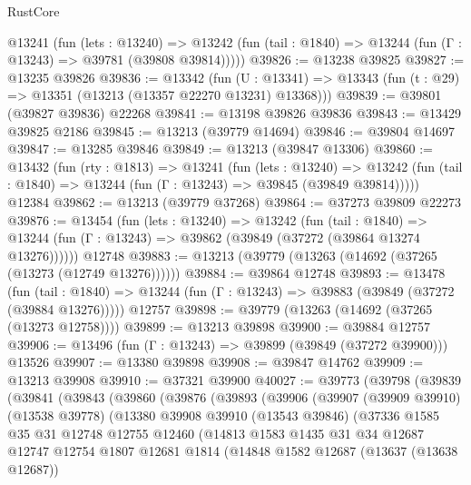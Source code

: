 \begin{lexlean}{RustCore}
\begin{coremodule}
    @13241
      (fun (lets : @13240) =>
      @13242 (fun (tail : @1840) => @13244 (fun (Γ : @13243) => @39781 (@39808 @39814)))))
@39826 := @13238 @39825
@39827 := @13235 @39826
@39836 := @13342
    (fun (U : @13341) => @13343 (fun (t : @29) => @13351 (@13213 (@13357 @22270 @13231) @13368)))
@39839 := @39801 (@39827 @39836) @22268
@39841 := @13198 @39826 @39836
@39843 := @13429 @39825 @2186
@39845 := @13213 (@39779 @14694)
@39846 := @39804 @14697
@39847 := @13285 @39846
@39849 := @13213 (@39847 @13306)
@39860 := @13432
    (fun (rty : @1813) =>
    @13241
      (fun (lets : @13240) =>
      @13242 (fun (tail : @1840) => @13244 (fun (Γ : @13243) => @39845 (@39849 @39814)))))
    @12384
@39862 := @13213 (@39779 @37268)
@39864 := @37273 @39809 @22273
@39876 := @13454
    (fun (lets : @13240) =>
    @13242
      (fun (tail : @1840) =>
      @13244 (fun (Γ : @13243) => @39862 (@39849 (@37272 (@39864 @13274 @13276))))))
    @12748
@39883 := @13213 (@39779 (@13263 (@14692 (@37265 (@13273 (@12749 @13276))))))
@39884 := @39864 @12748
@39893 := @13478
    (fun (tail : @1840) => @13244 (fun (Γ : @13243) => @39883 (@39849 (@37272 (@39884 @13276)))))
    @12757
@39898 := @39779 (@13263 (@14692 (@37265 (@13273 @12758))))
@39899 := @13213 @39898
@39900 := @39884 @12757
@39906 := @13496 (fun (Γ : @13243) => @39899 (@39849 (@37272 @39900))) @13526
@39907 := @13380 @39898
@39908 := @39847 @14762
@39909 := @13213 @39908
@39910 := @37321 @39900
@40027 := @39773
    (@39798
      (@39839
        (@39841
          (@39843
            (@39860
              (@39876
                (@39893
                  (@39906
                    (@39907
                      (@39909 @39910)
                      (@13538 @39778)
                      (@13380
                        @39908
                        @39910
                        (@13543 @39846)
                        (@37336
                          @1585
                          @35
                          @31
                          @12748
                          @12755
                          @12460
                          (@14813
                            @1583
                            @1435
                            @31
                            @34
                            @12687
                            @12747
                            @12754
                            @1807
                            @12681
                            @1814
                            (@14848
                              @1582
                              @12687
                              (@13637 (@13638 @12687))

\end{coremodule}
\end{lexlean}
